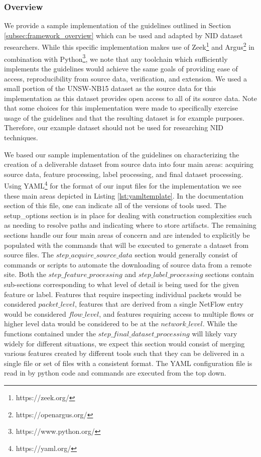 \documentclass[sigconf]{acmart}
\begin{document}
\subsubsection{Overview}\label{subsubsec:sample_overview}
We provide a sample implementation of the guidelines outlined in Section \ref{subsec:framework_overview} which can be used and adapted by NID dataset researchers.
While this specific implementation makes use of Zeek\footnote{https://zeek.org/} and Argus\footnote{https://openargus.org/} in combination with Python\footnote{https://www.python.org/}, we note that any toolchain which sufficiently implements the guidelines would achieve the same goals of providing ease of access, reproducibility from source data, verification, and extension.
We used a small portion of the UNSW-NB15 dataset \cite{unswnb15} as the source data for this implementation as this dataset provides open access to all of its source data.
Note that some choices for this implementation were made to specifically exercise usage of the guidelines and that the resulting dataset is for example purposes.
Therefore, our example dataset should not be used for researching NID techniques.

We based our sample implementation of the guidelines on characterizing the creation of a deliverable dataset from source data into four main areas:  acquiring source data, feature processing, label processing, and final dataset processing.
Using YAML\footnote{https://yaml.org/} for the format of our input files for the implementation we see these main areas depicted in Listing \ref{lst:yamltemplate}.
In the documentation section of this file, one can indicate all of the versions of tools used.
The setup\_options section is in place for dealing with construction complexities such as needing to resolve paths and indicating where to store artifacts.
The remaining sections handle our four main areas of concern and are intended to explicitly be populated with the commands that will be executed to generate a dataset from source files.
The $step\_acquire\_source\_data$ section would generally consist of commands or scripts to automate the downloading of source data from a remote site.
Both the $step\_feature\_processing$ and $step\_label\_processing$ sections contain sub-sections corresponding to what level of detail is being used for the given feature or label.
Features that require inspecting individual packets would be considered $packet\_level$, features that are derived from a single NetFlow entry would be considered $flow\_level$, and features requiring access to multiple flows or higher level data would be considered to be at the $network\_level$.
While the functions contained under the $step\_final\_dataset\_processing$ will likely vary widely for different situations, we expect this section would consist of merging various features created by different tools such that they can be delivered in a single file or set of files with a consistent format.
The YAML configuration file is read in by python code and commands are executed from the top down.
\end{document}

